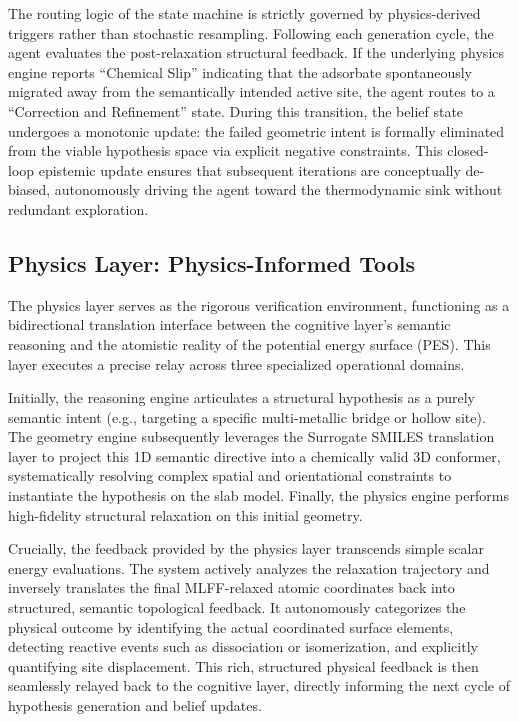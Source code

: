 \documentclass{article}
\begin{document}
The routing logic of the state machine is strictly governed by physics-derived triggers rather than stochastic resampling. Following each generation cycle, the agent evaluates the post-relaxation structural feedback. If the underlying physics engine reports ``Chemical Slip'' indicating that the adsorbate spontaneously migrated away from the semantically intended active site, the agent routes to a ``Correction and Refinement'' state. During this transition, the belief state undergoes a monotonic update: the failed geometric intent is formally eliminated from the viable hypothesis space via explicit negative constraints. This closed-loop epistemic update ensures that subsequent iterations are conceptually de-biased, autonomously driving the agent toward the thermodynamic sink without redundant exploration.

\subsection{Physics Layer: Physics-Informed Tools}
The physics layer serves as the rigorous verification environment, functioning as a bidirectional translation interface between the cognitive layer's semantic reasoning and the atomistic reality of the potential energy surface (PES). This layer executes a precise relay across three specialized operational domains.

Initially, the reasoning engine articulates a structural hypothesis as a purely semantic intent (e.g., targeting a specific multi-metallic bridge or hollow site). The geometry engine subsequently leverages the Surrogate SMILES translation layer to project this 1D semantic directive into a chemically valid 3D conformer, systematically resolving complex spatial and orientational constraints to instantiate the hypothesis on the slab model. Finally, the physics engine performs high-fidelity structural relaxation on this initial geometry.

Crucially, the feedback provided by the physics layer transcends simple scalar energy evaluations. The system actively analyzes the relaxation trajectory and inversely translates the final MLFF-relaxed atomic coordinates back into structured, semantic topological feedback. It autonomously categorizes the physical outcome by identifying the actual coordinated surface elements, detecting reactive events such as dissociation or isomerization, and explicitly quantifying site displacement. This rich, structured physical feedback is then seamlessly relayed back to the cognitive layer, directly informing the next cycle of hypothesis generation and belief updates.
\end{document}
